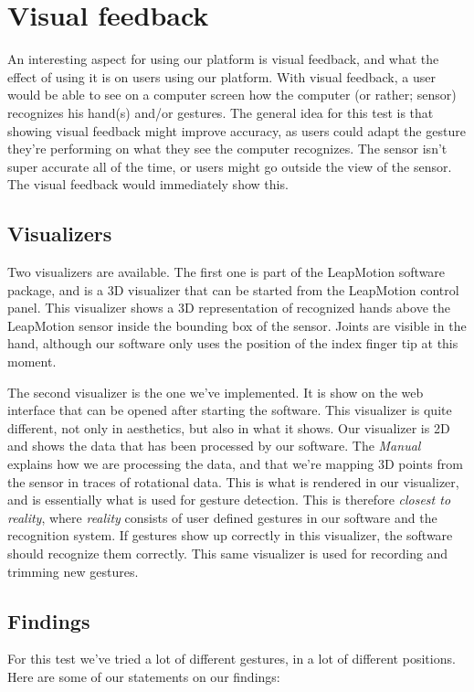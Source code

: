 \documentclass[a4paper]{article}
\begin{document}
  \clearpage

  \section{Visual feedback}
  An interesting aspect for using our platform is visual feedback, and what the
  effect of using it is on users using our platform. With visual feedback, a
  user would be able to see on a computer screen how the computer (or rather;
  sensor) recognizes his hand(s) and/or gestures. The general idea for this test
  is that showing visual feedback might improve accuracy, as users could adapt
  the gesture they're performing on what they see the computer recognizes.
  The sensor isn't super accurate all of the time, or users might go outside the
  view of the sensor. The visual feedback would immediately show this.

  \subsection{Visualizers}
  Two visualizers are available. The first one is part of the LeapMotion
  software package, and is a 3D visualizer that can be started from the
  LeapMotion control panel. This visualizer shows a 3D representation of
  recognized hands above the LeapMotion sensor inside the bounding box of the
  sensor. Joints are visible in the hand, although our software only uses the
  position of the index finger tip at this moment.

  The second visualizer is the one we've implemented. It is show on the web
  interface that can be opened after starting the software. This visualizer is
  quite different, not only in aesthetics, but also in what it shows. Our
  visualizer is 2D and shows the data that has been processed by our software.
  The \emph{Manual} explains how we are processing the data, and that we're
  mapping 3D points from the sensor in traces of rotational data. This is what
  is rendered in our visualizer, and is essentially what is used for gesture
  detection. This is therefore \emph{closest to reality}, where \emph{reality}
  consists of user defined gestures in our software and the recognition system.
  If gestures show up correctly in this visualizer, the software should
  recognize them correctly. This same visualizer is used for recording and
  trimming new gestures.

  \subsection{Findings}
  For this test we've tried a lot of different gestures, in a lot of different
  positions. Here are some of our statements on our findings:
\end{document}

